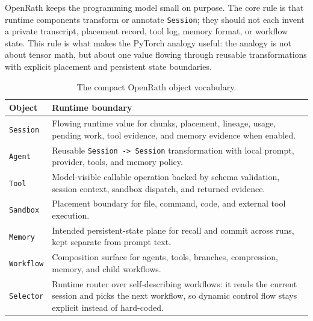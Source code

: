 \documentclass{llmxive}
\begin{document}
OpenRath keeps the programming model small on purpose. The core rule is that
runtime components transform or annotate \texttt{Session}; they should not each
invent a private transcript, placement record, tool log, memory format, or
workflow state. This rule is what makes the PyTorch analogy useful: the analogy
is not about tensor math, but about one value flowing through reusable
transformations with explicit placement and persistent state boundaries.

\begin{table}[!htbp]
\vspace{0.15em}
\centering
\small
\begin{tabularx}{\linewidth}{@{}lX@{}}
\toprule
Object & Runtime boundary \\
\midrule
\texttt{Session} & Flowing runtime value for chunks, placement, lineage, usage, pending work, tool evidence, and memory evidence when enabled. \\
\texttt{Agent} & Reusable \texttt{Session -> Session} transformation with local prompt, provider, tools, and memory policy. \\
\texttt{Tool} & Model-visible callable operation backed by schema validation, session context, sandbox dispatch, and returned evidence. \\
\texttt{Sandbox} & Placement boundary for file, command, code, and external tool execution. \\
\texttt{Memory} & Intended persistent-state plane for recall and commit across runs, kept separate from prompt text. \\
\texttt{Workflow} & Composition surface for agents, tools, branches, compression, memory, and child workflows. \\
\texttt{Selector} & Runtime router over self-describing workflows: it reads the current session and picks the next workflow, so dynamic control flow stays explicit instead of hard-coded. \\
\bottomrule
\end{tabularx}
\vspace{0.15em}
\caption{The compact OpenRath object vocabulary.}
\label{tab:programming-model-vocabulary}
\end{table}
\end{document}
